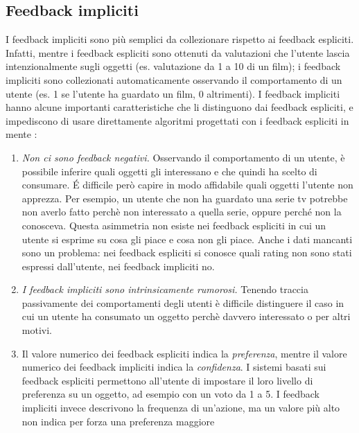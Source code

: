 \subsection{Feedback impliciti}
I feedback impliciti sono più semplici da collezionare rispetto ai feedback espliciti. Infatti, mentre i feedback espliciti sono ottenuti da valutazioni che l'utente lascia intenzionalmente sugli oggetti (es. valutazione da 1 a 10 di un film); i feedback impliciti sono collezionati automaticamente osservando il comportamento di un utente (es. 1 se l'utente ha guardato un film, 0 altrimenti).
I feedback impliciti hanno alcune importanti caratteristiche che li distinguono dai feedback espliciti, e impediscono di usare direttamente algoritmi progettati con i feedback espliciti in mente \cite{als}:
\begin{enumerate}
 \item \textit{Non ci sono feedback negativi.} Osservando il comportamento di un utente, è possibile inferire quali oggetti gli interessano e che quindi ha scelto di consumare. \'E difficile però capire in modo affidabile quali oggetti l'utente non apprezza. Per esempio, un utente che non ha guardato una serie tv potrebbe non averlo fatto perchè non interessato a quella serie, oppure perché non la conosceva. Questa asimmetria non esiste nei feedback espliciti in cui un utente si esprime su cosa gli piace e cosa non gli piace. Anche i dati mancanti sono un problema: nei feedback espliciti si conosce quali rating non sono stati espressi dall'utente, nei feedback impliciti no.
 
 \item \textit{I feedback impliciti sono intrinsicamente rumorosi.} Tenendo traccia passivamente dei comportamenti degli utenti è difficile distinguere il caso in cui un utente ha consumato un oggetto perchè davvero interessato o per altri motivi.
 
 \item Il valore numerico dei feedback espliciti indica la \textit{preferenza}, mentre il valore numerico dei feedback impliciti indica la \textit{confidenza}. I sistemi basati sui feedback espliciti permettono all'utente di impostare il loro livello di preferenza su un oggetto, ad esempio con un voto da 1 a 5. I feedback impliciti invece descrivono la frequenza di un'azione, ma un valore più alto  non indica per forza una preferenza maggiore
\end{enumerate}

